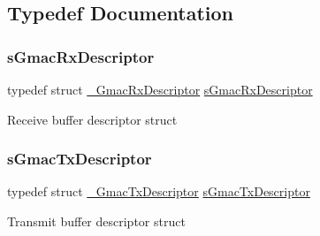 \subsection{Typedef Documentation}
\mbox{\label{group__gmac__structs_ga60c9fd1b0bff688c6e72c825d088a50b}} 
\subsubsection{\texorpdfstring{sGmacRxDescriptor}{sGmacRxDescriptor}}
{\footnotesize\ttfamily typedef struct \mbox{\hyperlink{struct__GmacRxDescriptor}{\+\_\+\+Gmac\+Rx\+Descriptor}}  \mbox{\hyperlink{group__gmac__structs_ga60c9fd1b0bff688c6e72c825d088a50b}{s\+Gmac\+Rx\+Descriptor}}}

Receive buffer descriptor struct \mbox{\label{group__gmac__structs_ga69a2b24578edebf2e816c4d3ca20edeb}} 
\subsubsection{\texorpdfstring{sGmacTxDescriptor}{sGmacTxDescriptor}}
{\footnotesize\ttfamily typedef struct \mbox{\hyperlink{struct__GmacTxDescriptor}{\+\_\+\+Gmac\+Tx\+Descriptor}}  \mbox{\hyperlink{group__gmac__structs_ga69a2b24578edebf2e816c4d3ca20edeb}{s\+Gmac\+Tx\+Descriptor}}}

Transmit buffer descriptor struct 
